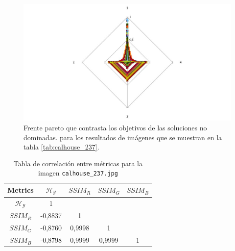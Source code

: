     \begin{figure}[H]
    \centering
    \includegraphics[width=\textwidth]{./Figures/calhouse_237/calhouse_237_2.jpg}
    \caption{Frente pareto que contrasta los objetivos de las soluciones no dominadas. para los resultados de imágenes que se muestran en la tabla \ref{tab:calhouse_237}.}
    \label{fig:calhouse2372fp}
    \end{figure}

\begin{table}[H]
\setlength{\abovecaptionskip}{2pt plus 3pt minus 2pt} %
\caption[Parámetros de entrada para $MOPSO$]{Tabla de correlación entre métricas para la imagen \texttt{calhouse\_237.jpg}}
\begin{center}
 \begin{tabular}{||c | c c c c||} 
 \hline
Metrics & $\mathscr{H_Y}$ & $SSIM_R$ & $SSIM_G$ & $SSIM_B$ \\ 
\hline
$\mathscr{H_Y}$ & 1 &  &  & \\ 
\hline
$SSIM_R$ & -0,8837 & 1 &  \\ 
\hline
$SSIM_G$ & -0,8760 & 0,9998  & 1  & \\ 
\hline
$SSIM_B$ & -0,8798 & 0,9999  & 0,9999  & 1 \\ 
\hline
\end{tabular}
\end{center}
\label{table:correlacion}
\end{table}




